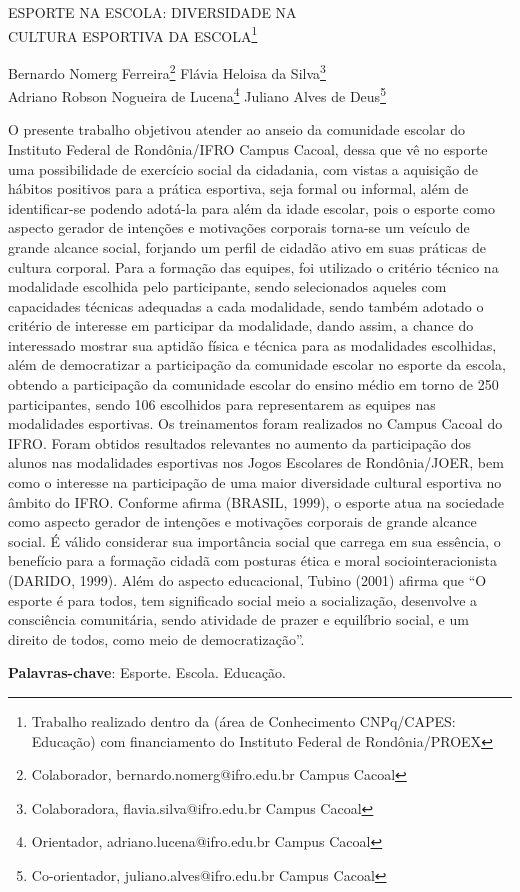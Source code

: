 \documentclass[article,12pt,onesidea,4paper,english,brazil]{abntex2}
\begin{document}
	
	
	\frenchspacing 
	
	\begin{center}
		\LARGE ESPORTE NA ESCOLA: DIVERSIDADE NA\\CULTURA ESPORTIVA DA ESCOLA\footnote{Trabalho realizado dentro da (área de Conhecimento CNPq/CAPES: Educação) com financiamento do Instituto Federal de Rondônia/PROEX}
		
		\normalsize
		Bernardo Nomerg Ferreira\footnote{Colaborador, bernardo.nomerg@ifro.edu.br  Campus Cacoal} 
		Flávia Heloisa da Silva\footnote{Colaboradora, flavia.silva@ifro.edu.br  Campus Cacoal} \\
		Adriano Robson Nogueira de Lucena\footnote{Orientador, adriano.lucena@ifro.edu.br  Campus Cacoal} 
		Juliano Alves de Deus\footnote{Co-orientador, juliano.alves@ifro.edu.br  Campus Cacoal} 
	\end{center}
	
	\noindent O presente trabalho objetivou atender ao anseio da comunidade escolar do Instituto Federal de Rondônia/IFRO Campus Cacoal, dessa que vê no esporte uma possibilidade de exercício social da cidadania, com vistas a aquisição de hábitos positivos para a prática esportiva, seja formal ou informal, além de identificar-se podendo adotá-la para além da idade escolar, pois o esporte como aspecto gerador de intenções e motivações corporais torna-se um veículo de grande alcance social, forjando um perfil de cidadão ativo em suas práticas de cultura corporal. Para a formação das equipes, foi utilizado o critério técnico na modalidade escolhida pelo participante, sendo selecionados aqueles com capacidades técnicas adequadas a cada modalidade, sendo também adotado o critério de interesse em participar da modalidade, dando assim, a chance do interessado mostrar sua aptidão física e técnica para as modalidades escolhidas, além de democratizar a participação da comunidade escolar no esporte da escola, obtendo a participação da comunidade escolar do ensino médio em torno de 250 participantes, sendo 106 escolhidos para representarem as equipes nas modalidades esportivas. Os treinamentos foram realizados no Campus Cacoal do IFRO. Foram obtidos resultados relevantes no aumento da participação dos alunos nas modalidades esportivas nos Jogos Escolares de Rondônia/JOER, bem como o interesse na participação de uma maior diversidade cultural esportiva no âmbito do IFRO. Conforme afirma (BRASIL, 1999), o esporte atua na sociedade como aspecto gerador de intenções e motivações corporais de grande alcance social. É válido considerar sua importância social que carrega em sua essência, o benefício para a formação cidadã com posturas ética e moral sociointeracionista (DARIDO, 1999). Além do aspecto educacional, Tubino (2001) afirma que “O esporte é para todos, tem significado social meio a socialização, desenvolve a consciência comunitária, sendo atividade de prazer e equilíbrio social, e um direito de todos, como meio de democratização”.
	
	\vspace{\onelineskip}
	
	\noindent
	\textbf{Palavras-chave}: Esporte. Escola. Educação.
	
\end{document}
